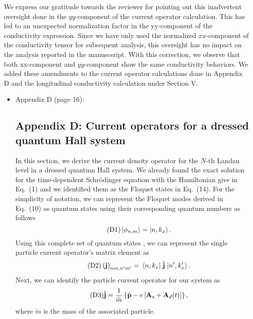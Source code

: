 \documentclass{article}
\begin{document}
We express our gratitude towards the reviewer for pointing out this inadvertent oversight done in the $yy$-component of the current operator calculation. This has led to an unexpected normalization factor in the yy-component of the  conductivity expression. Since we have only used the normalized $xx$-component of the conductivity tensor for subsequent analysis, this oversight has no impact on the analysis reported in the  manuscsript. With this correction, we observe that both xx-component and $yy$-component show the same conductivity behaviors. We added these amendments to the current operator calculations done in Appendix D and the longitudinal conductivity calculation under Section V.

\begin{itemize}
  \item Appendix D (page 16):\\
  {\color{Red}
  \subsection*{\label{appendix_d}Appendix D: Current operators for a dressed quantum Hall system}

  In this section, we derive the current density operator for the $N$-th Landau level in a dressed quantum Hall system. We already found the exact solution for the time-dependent Schrödinger equation with the Hamiltonian give in Eq.~(1) and we identified them as the Floquet states in Eq.~(14). For the simplicity of notation, we can represent the Floquet modes derived in Eq.~(10) as quantum states using their corresponding quantum numbers as follows
  \begin{equation} \tag{D1}
    \ket{\phi_{n,m}} = \ket{n,k_x}.
  \end{equation}
  Using this complete set of quantum states \cite{wackerl20,holthaus15,grifoni98}, we can represent the single particle current operator's matrix element as
  \begin{equation} \tag{D2}
    \left(\vb{j} \right)_{nm,n'm'} = \mel{n,k_x}{\;\hat{\vb{j}}\;}{n',k'_x}.
  \end{equation}
  Next, we can identify the particle current operator for our system \cite{mahan00,bruus04} as
  \begin{equation} \tag{D3}
    \hat{\vb{j}} = \frac{1}{\widetilde{m}} \left\{\hat{\vb{p}} - e\left[\vb{A}_s + \vb{A}_d(t) \right]\right\},
  \end{equation}
  where $\widetilde{m}$ is the mass of the associated particle.

}
\end{itemize}
\end{document}
